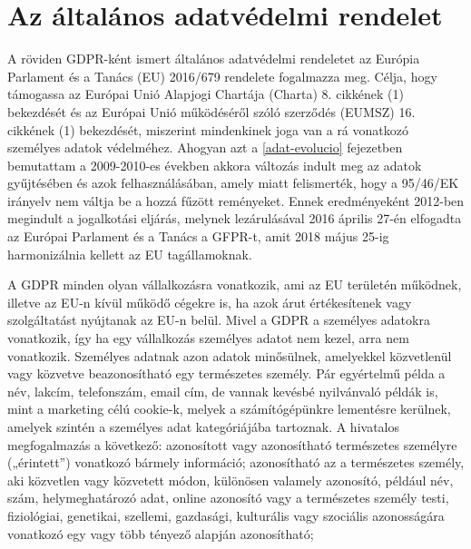 \section{Az általános adatvédelmi rendelet}

A röviden GDPR-ként ismert általános adatvédelmi rendeletet az Európia Parlament és a Tanács (EU) 2016/679 rendelete fogalmazza meg. Célja, hogy támogassa az Európai Unió Alapjogi Chartája (Charta) 8. cikkének (1) bekezdését és az Európai Unió működéséről szóló szerződés (EUMSZ) 16. cikkének (1) bekezdését, miszerint mindenkinek joga van a rá vonatkozó személyes adatok védelméhez. Ahogyan azt a \ref{adat-evolucio} fejezetben bemutattam a 2009-2010-es években akkora változás indult meg az adatok gyűjtésében és azok felhasználásában, amely miatt felismerték, hogy a 95/46/EK irányelv \cite{95/46/EK} nem váltja be a hozzá fűzött reményeket. Ennek eredményeként 2012-ben megindult a jogalkotási eljárás, melynek lezárulásával 2016 április 27-én elfogadta az Európai Parlament és a Tanács a GFPR-t, amit 2018 május 25-ig harmonizálnia kellett az EU tagállamoknak.

A GDPR minden olyan vállalkozásra vonatkozik, ami az EU területén működnek, illetve az EU-n kívül működő cégekre is, ha azok árut értékesítenek vagy szolgáltatást nyújtanak az EU-n belül. Mivel a GDPR a személyes adatokra vonatkozik, így ha egy vállalkozás személyes adatot nem kezel, arra nem vonatkozik. Személyes adatnak azon adatok minősülnek, amelyekkel közvetlenül vagy közvetve beazonosítható egy természetes személy. Pár egyértelmű példa a név, lakcím, telefonszám, email cím, de vannak kevésbé nyilvánvaló példák is, mint a marketing célú cookie-k, melyek a számítógépünkre lementésre kerülnek, amelyek szintén a személyes adat kategóriájába tartoznak. A hivatalos megfogalmazás a következő: azonosított vagy azonosítható természetes személyre („érintett”) vonatkozó bármely információ; azonosítható az a természetes személy, aki közvetlen vagy közvetett módon, különösen valamely azonosító, például név, szám, helymeghatározó adat, online azonosító vagy a természetes személy testi, fiziológiai, genetikai, szellemi, gazdasági, kulturális vagy szociális azonosságára vonatkozó egy vagy több tényező alapján azonosítható;

